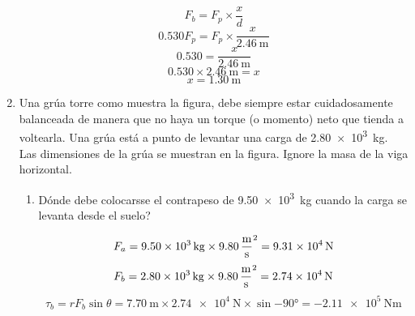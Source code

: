 \documentclass[Física - Práctica.root.tex]{subfiles}
\begin{document}
\begin{enumerate}
\begin{multicols}{2}
\begin{center}
          \end{center}

          \[F_b=F_p\times\frac{x}{d}\]
          \[\num{0,530}F_p=F_p\times\frac{x}{\SI{2,46}{\meter}}\]
          \[\num{0,530}=\frac{x}{\SI{2,46}{\meter}}\]
          \[\num{0,530}\times\SI{2,46}{\meter}=x\]
          \[x=\boxed{\SI{1,30}{\meter}}\]
        \end{multicols}

        \newpage
  \item Una grúa torre como muestra la figura, debe siempre estar cuidadosamente balanceada de manera que no haya un torque (o momento) neto que tienda a voltearla. Una grúa está a punto de levantar una carga de \SI{2,80e3}{\kilogram}. Las dimensiones de la grúa se muestran en la figura. Ignore la masa de la viga horizontal.

        \begin{center}
        \end{center}

        \begin{enumerate}
          \item Dónde debe colocarsse el contrapeso de \SI{9,50e3}{\kilogram} cuando la carga se levanta desde el suelo?

                \[
                  F_a=\SI{9,50e3}{\kilogram}\times\SI{9,80}{\meter\over\second\squared}
                  =\SI{9,31e4}{\newton}
                \]
                \[
                  F_b=\SI{2,80e3}{\kilogram}\times\SI{9,80}{\meter\over\second\squared}
                  =\SI{2,74e4}{\newton}
                \]
                \[
                  \tau_b=rF_b\sin{\theta}
                  =\SI{7,70}{\meter}\times\SI{2,74e4}{\newton}\times\sin{\ang{-90}}
                  =\SI{-2,11e5}{\newton\meter}
                \]


\end{enumerate}
\end{enumerate}
\end{document}
